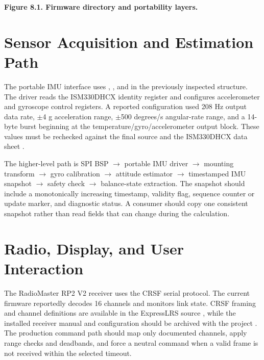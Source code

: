 \begin{center}\singlespacing
{}
\textbf{Figure 8.1. Firmware directory and portability layers.}
\end{center}

\section{Sensor Acquisition and Estimation Path}\label{sensor-acquisition-and-estimation-path}

The portable IMU interface uses ,
, and
 in the previously inspected
structure. The driver reads the ISM330DHCX identity register and
configures accelerometer and gyroscope control registers. A reported
configuration used 208 Hz output data rate, \ensuremath{\pm}4 g acceleration range,
\ensuremath{\pm}500 degrees\slash{}s angular-rate range, and a 14-byte burst beginning at the
temperature\slash{}gyro\slash{}accelerometer output block. These values must be
rechecked against the final source and the ISM330DHCX data sheet
\cite{st2026ism330dhcx}.

The higher-level path is SPI BSP \ensuremath{\rightarrow} portable IMU driver \ensuremath{\rightarrow} mounting
transform \ensuremath{\rightarrow} gyro calibration \ensuremath{\rightarrow} attitude estimator \ensuremath{\rightarrow} timestamped IMU
snapshot \ensuremath{\rightarrow} safety check \ensuremath{\rightarrow} balance-state extraction. The snapshot should
include a monotonically increasing timestamp, validity flag, sequence
counter or update marker, and diagnostic status. A consumer should copy
one consistent snapshot rather than read fields that can change during
the calculation.

\section{Radio, Display, and User Interaction}\label{radio-display-and-user-interaction}

The RadioMaster RP2 V2 receiver uses the CRSF serial protocol. The
current firmware reportedly decodes 16 channels and monitors link state.
CRSF framing and channel definitions are available in the ExpressLRS
source \cite{expresslrs2026crsf}, while the installed receiver manual and configuration
should be archived with the project \cite{radiomaster2026manuals}. The production command
path should map only documented channels, apply range checks and
deadbands, and force a neutral command when a valid frame is not
received within the selected timeout.

